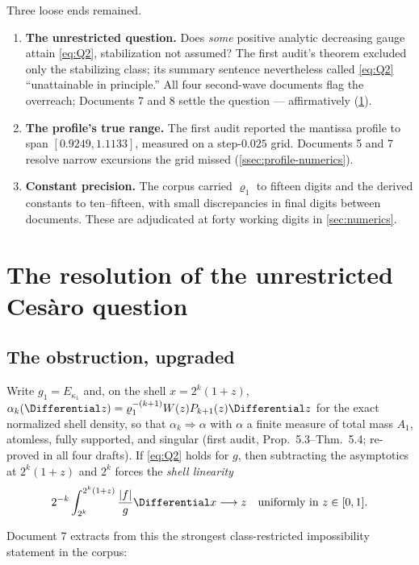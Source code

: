 \documentclass[11pt,oneside]{article}
\theoremstyle{definition}
\theoremstyle{remark}
\begin{document}
Three loose ends remained.
\begin{enumerate}
\item \textbf{The unrestricted question.}  Does \emph{some} positive
analytic decreasing gauge attain \eqref{eq:Q2}, stabilization not
assumed?  The first audit's theorem excluded only the stabilizing
class; its summary sentence nevertheless called \eqref{eq:Q2}
``unattainable in principle.''  All four second-wave documents flag the
overreach; Documents 7 and 8 settle the question --- affirmatively
(\cref{sec:resolution}).
\item \textbf{The profile's true range.}  The first audit reported the
mantissa profile to span $[0.9249,1.1133]$, measured on a step-$0.025$
grid.  Documents 5 and 7 resolve narrow excursions the grid missed
(\cref{ssec:profile-numerics}).
\item \textbf{Constant precision.}  The corpus carried
$\varrho_1$ to fifteen digits and the derived constants to ten--fifteen,
with small discrepancies in final digits between documents.  These are
adjudicated at forty working digits in \cref{sec:numerics}.
\end{enumerate}

\section{The resolution of the unrestricted Ces\`aro question}
\label{sec:resolution}

\subsection{The obstruction, upgraded}
\label{ssec:obstruction}

Write $g_1=E_{\kappa_1}$ and, on the shell $x=2^k(1+z)$,
$\alpha_k(\Differential z)=\varrho_1^{-(k+1)}W(z)P_{k+1}(z)\Differential z$ for the exact
normalized shell density, so that $\alpha_k\Rightarrow\alpha$ with
$\alpha$ a finite measure of total mass $A_1$, atomless, fully
supported, and singular (first audit, Prop.~5.3--Thm.~5.4; re-proved in
all four drafts).  If \eqref{eq:Q2} holds for $g$, then subtracting the
asymptotics at $2^k(1+z)$ and $2^k$ forces the \emph{shell linearity}
\begin{equation}
 2^{-k}\int_{2^k}^{2^k(1+z)}\frac{|f|}{g}\Differential x\longrightarrow z
 \quad\text{uniformly in }z\in[0,1].
 \label{eq:shell-linearity}
\end{equation}

Document 7 extracts from this the strongest class-restricted
impossibility statement in the corpus:
\end{document}
